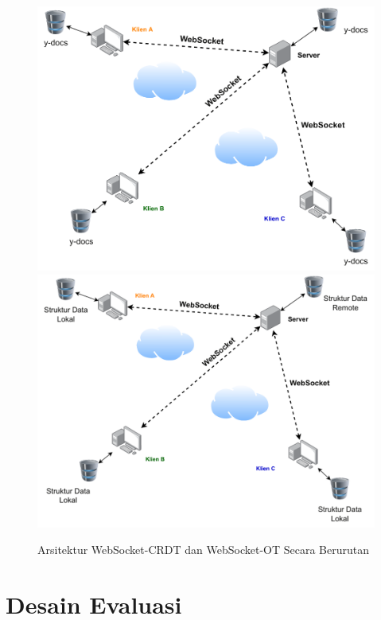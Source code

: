 \begin{figure}
    \centering
    \includegraphics[scale=0.42]{assets/skripsi/Arsitektur_WebSocket_CRDT}
    \includegraphics[scale=0.42]{assets/skripsi/Arsitektur_WebSocket_OT}
    \caption{Arsitektur WebSocket-CRDT dan WebSocket-OT Secara Berurutan}
\end{figure}


\section{Desain Evaluasi}
\label{sec:desain_evaluasi}